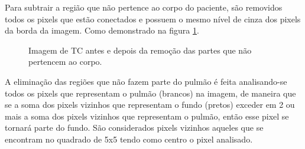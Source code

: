 Para subtrair a região que não pertence ao corpo do paciente, são removidos todos os pixels que estão conectados e possuem o mesmo nível de cinza dos pixels da borda da imagem. Como demonstrado na figura \ref{fig:remocao}.

\begin{figure}[ht]
 \begin{center}
 \end{center}
 \caption{Imagem de TC antes e depois da remoção das partes que não pertencem ao corpo.}
 \label{fig:remocao}
\end{figure}

A eliminação das regiões que não fazem parte do pulmão é feita analisando-se todos os pixels que representam o pulmão (brancos) na imagem, de maneira que se a soma dos pixels vizinhos que representam o fundo (pretos) exceder em 2 ou mais a soma dos pixels vizinhos que representam o pulmão, então esse pixel se tornará parte do fundo. São considerados pixels vizinhos aqueles que se encontram no quadrado de 5x5 tendo como centro o pixel analisado.

